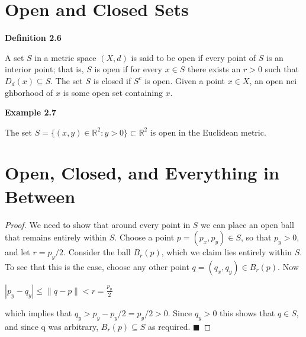 \documentclass{article}
\theoremstyle{definition}
\numberwithin{equation}{section}
\begin{document}
\section{Open and Closed Sets}

\begin{mydefbox}
\textbf{Definition 2.6} 

A set $S$ in a metric space $(X, d)$ is said to be open if every point of $S$ is an interior point; that is, $S$ is open if for every $x \in S$ there exists an $r > 0$ such that $D_{d}(x) \subseteq S$. The set $S$ is closed if $S^c$ is open. Given a point $x \in X$, an open nei {gh}borhood of $x$ is some open set containing $x$.
\end{mydefbox}

\begin{myexamplebox}
\textbf{Example 2.7}

The set $S=\{(x,y)\in\mathbb{R}^2 : y > 0\} \subset \mathbb{R}^2$ is open in the Euclidean metric.
\end{myexamplebox}

\section{Open, Closed, and Everything in Between}

\begin{center}
\end{center}

\begin{proof}
We need to show that around every point in $S$ we can place an open ball that remains entirely within $S$. Choose a point $p = (p_{x}, p_{y}) \in S$, so that $p_{y} > 0$, and let $r = p_{y}/2$. Consider the ball $B_{r}(p)$, which we claim lies entirely within $S$. To see that this is the case, choose any other point $q = (q_{x}, q_{y}) \in B_{r}(p)$. Now

$
|p_{y} - q_{y}| \leq \|q - p\| < r = \frac{p_{y}}{2}
$

which implies that $q_{y} > p_{y} - p_{y}/2 = p_{y}/2 > 0$. Since $q_{y} > 0$ this shows that $q \in S$, and since q was arbitrary, $B_{r}(p) \subseteq S$ as required. $\blacksquare$
\end{proof}
\end{document}
